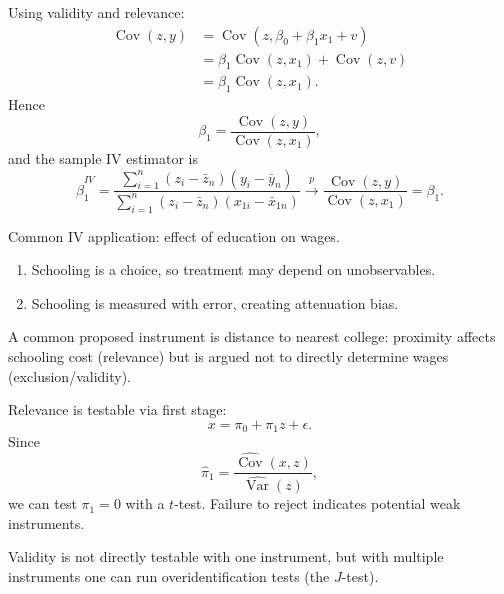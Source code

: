 \begin{proposition}
	Using validity and relevance:
	\begin{align*}
		\operatorname{Cov}(z, y)
		&= \operatorname{Cov}(z, \beta_0 + \beta_1 x_1 + v) \\
		&= \beta_1 \operatorname{Cov}(z, x_1) + \operatorname{Cov}(z, v) \\
		&= \beta_1 \operatorname{Cov}(z, x_1)
	.\end{align*}
	Hence \[
		\beta_1 = \frac{\operatorname{Cov}(z, y)}{\operatorname{Cov}(z, x_1)}
	,\]
	and the sample IV estimator is \[
		\hat{\beta}_1^{IV} = \frac{\sum_{i=1}^{n}(z_i-\bar{z}_n)(y_i-\bar{y}_n)}{\sum_{i=1}^{n}(z_i-\bar{z}_n)(x_{1i}-\bar{x}_{1n})} \xrightarrow{p} \frac{\operatorname{Cov}(z, y)}{\operatorname{Cov}(z, x_1)} = \beta_1
	.\]
\end{proposition}

\begin{example}
	Common IV application: effect of education on wages.
	\begin{enumerate}[label=(\roman*)]
		\item Schooling is a choice, so treatment may depend on unobservables.
		\item Schooling is measured with error, creating attenuation bias.
	\end{enumerate}
	A common proposed instrument is distance to nearest college: proximity affects schooling cost (relevance) but is argued not to directly determine wages (exclusion/validity).
\end{example}

\begin{remark}
	Relevance is testable via first stage: \[
		x = \pi_0 + \pi_1 z + \epsilon
	.\]
	Since \[
		\hat{\pi}_1 = \frac{\widehat{\operatorname{Cov}}(x, z)}{\widehat{\operatorname{Var}}(z)}
	,\]
	we can test $\pi_1=0$ with a $t$-test. Failure to reject indicates potential weak instruments.

	Validity is not directly testable with one instrument, but with multiple instruments one can run overidentification tests (the $J$-test).
\end{remark}

